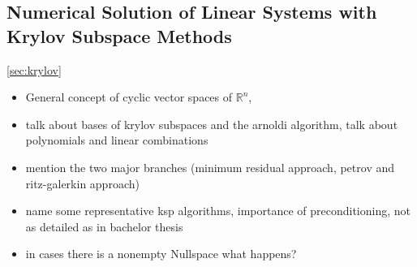       \subsection{Numerical Solution of Linear Systems with Krylov Subspace Methods}
      \ref{sec:krylov}

        \begin{itemize}
          \item General concept of cyclic vector spaces of \(\mathbb{R}^n\), 
          \item talk about bases of krylov subspaces and the arnoldi algorithm, talk about polynomials and linear combinations
          \item mention the two major branches (minimum residual approach, petrov and ritz-galerkin approach) 
          \item name some representative ksp algorithms, importance of preconditioning, not as detailed as in bachelor thesis
          \item in cases there is a nonempty Nullspace what happens?
        \end{itemize}

